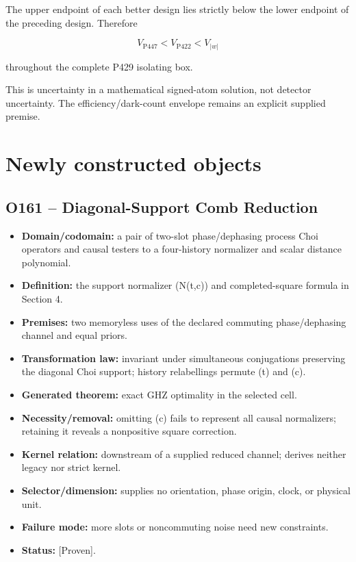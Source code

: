 \documentclass[11pt,a4paper,openany]{report}
\newcommand{\statusProven}{\textcolor{fingreen}{[Proven]}}
\begin{document}
The upper endpoint of each better design lies strictly below the lower endpoint of the preceding design. Therefore

\[
V_{\mathrm{P447}}<V_{\mathrm{P422}}<V_{|w|}
\]

throughout the complete P429 isolating box.

This is uncertainty in a mathematical signed-atom solution, not detector uncertainty. The efficiency/\allowbreak{}dark-count envelope remains an explicit supplied premise.

\chapter{Newly constructed objects}

\section{O161 -- Diagonal-Support Comb Reduction}

\begin{itemize}
\item 
\textbf{Domain/\allowbreak{}codomain:} a pair of two-slot phase/\allowbreak{}dephasing process Choi operators and causal testers to a four-history normalizer and scalar distance polynomial.

\item 
\textbf{Definition:} the support normalizer (N(t,c)) and completed-square formula in Section 4.

\item 
\textbf{Premises:} two memoryless uses of the declared commuting phase/\allowbreak{}dephasing channel and equal priors.

\item 
\textbf{Transformation law:} invariant under simultaneous conjugations preserving the diagonal Choi support; history relabellings permute (t) and (c).

\item 
\textbf{Generated theorem:} exact GHZ optimality in the selected cell.

\item 
\textbf{Necessity/\allowbreak{}removal:} omitting (c) fails to represent all causal normalizers; retaining it reveals a nonpositive square correction.

\item 
\textbf{Kernel relation:} downstream of a supplied reduced channel; derives neither legacy nor strict kernel.

\item 
\textbf{Selector/\allowbreak{}dimension:} supplies no orientation, phase origin, clock, or physical unit.

\item 
\textbf{Failure mode:} more slots or noncommuting noise need new constraints.

\item 
\textbf{Status:} \statusProven{}.

\end{itemize}
\end{document}
